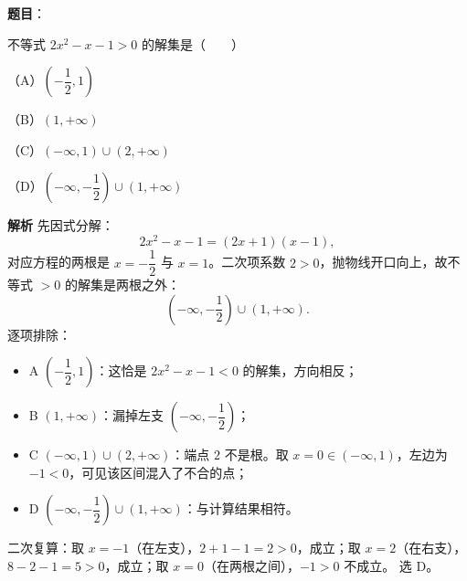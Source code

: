 \begin{answer}

\textbf{题目}：

不等式 $2x^2-x-1>0$ 的解集是\mbox{（　　）}

（A）$\left(-\dfrac12,1\right)$

（B）$(1,+\infty)$

（C）$(-\infty,1)\cup(2,+\infty)$

（D）$\left(-\infty,-\dfrac12\right)\cup(1,+\infty)$

\textbf{解析}
先因式分解：
\nopagebreak[4]
\[
2x^2-x-1=(2x+1)(x-1),
\]
对应方程的两根是 $x=-\dfrac12$ 与 $x=1$。二次项系数 $2>0$，抛物线开口向上，故不等式 $>0$ 的解集是两根之外：
\nopagebreak[4]
\[
\left(-\infty,-\frac12\right)\cup(1,+\infty).
\]
逐项排除：
\begin{itemize}
\item A $\left(-\dfrac12,1\right)$：这恰是 $2x^2-x-1<0$ 的解集，方向相反；
\item B $(1,+\infty)$：漏掉左支 $\left(-\infty,-\dfrac12\right)$；
\item C $(-\infty,1)\cup(2,+\infty)$：端点 $2$ 不是根。取 $x=0\in(-\infty,1)$，左边为 $-1<0$，可见该区间混入了不合的点；
\item D $\left(-\infty,-\dfrac12\right)\cup(1,+\infty)$：与计算结果相符。
\end{itemize}
二次复算：取 $x=-1$（在左支），$2+1-1=2>0$，成立；取 $x=2$（在右支），$8-2-1=5>0$，成立；取 $x=0$（在两根之间），$-1>0$ 不成立。
选 D。


\end{answer}
